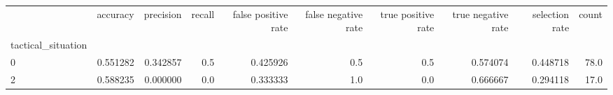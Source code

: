 \begin{tabular}{lrrrrrrrrr}
\toprule
{} &  accuracy &  precision &  recall &  false positive rate &  false negative rate &  true positive rate &  true negative rate &  selection rate &  count \\
tactical\_situation &           &            &         &                      &                      &                     &                     &                 &        \\
\midrule
0                  &  0.551282 &   0.342857 &     0.5 &             0.425926 &                  0.5 &                 0.5 &            0.574074 &        0.448718 &   78.0 \\
2                  &  0.588235 &   0.000000 &     0.0 &             0.333333 &                  1.0 &                 0.0 &            0.666667 &        0.294118 &   17.0 \\
\bottomrule
\end{tabular}
